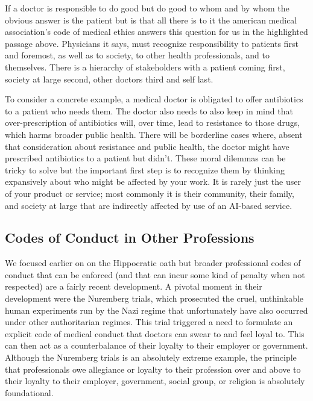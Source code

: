 \documentclass[
]{book}
\theoremstyle{definition}
\theoremstyle{definition}
\theoremstyle{definition}
\theoremstyle{definition}
\theoremstyle{remark}
\begin{document}
If a doctor is responsible to do good but do good to whom and by whom the obvious answer is the patient but is that all there is to it the american medical association's code of medical ethics answers this question for us in the highlighted passage above. Physicians it says, must recognize responsibility to patients first and foremost, as well as to society, to other health professionals, and to themselves. There is a hierarchy of stakeholders with a patient coming first, society at large second, other doctors third and self last.

To consider a concrete example, a medical doctor is obligated to offer antibiotics to a patient who needs them. The doctor also needs to also keep in mind that over-prescription of antibiotics will, over time, lead to resistance to those drugs, which harms broader public health. There will be borderline cases where, absent that consideration about resistance and public health, the doctor might have prescribed antibiotics to a patient but didn't. These moral dilemmas can be tricky to solve but the important first step is to recognize them by thinking expansively about who might be affected by your work. It is rarely just the user of your product or service; most commonly it is their community, their family, and society at large that are indirectly affected by use of an AI-based service.

\hypertarget{codes-of-conduct-in-other-professions}{%
\subsection{Codes of Conduct in Other Professions}\label{codes-of-conduct-in-other-professions}}

We focused earlier on on the Hippocratic oath but broader professional codes of conduct that can be enforced (and that can incur some kind of penalty when not respected) are a fairly recent development. A pivotal moment in their development were the Nuremberg trials, which prosecuted the cruel, unthinkable human experiments run by the Nazi regime that unfortunately have also occurred under other authoritarian regimes. This trial triggered a need to formulate an explicit code of medical conduct that doctors can swear to and feel loyal to. This can then act as a counterbalance of their loyalty to their employer or government. Although the Nuremberg trials is an absolutely extreme example, the principle that professionals owe allegiance or loyalty to their profession over and above to their loyalty to their employer, government, social group, or religion is absolutely foundational.
\end{document}
